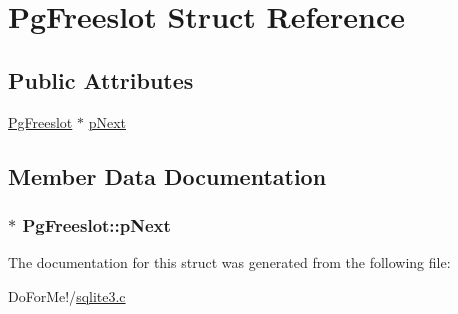 \hypertarget{struct_pg_freeslot}{\section{Pg\-Freeslot Struct Reference}
\label{struct_pg_freeslot}
}
\subsection*{Public Attributes}
\begin{DoxyCompactItemize}
\item 
\hyperlink{struct_pg_freeslot}{Pg\-Freeslot} $\ast$ \hyperlink{struct_pg_freeslot_ac38a6e51f86c650fb943585d7b6c8b70}{p\-Next}
\end{DoxyCompactItemize}


\subsection{Member Data Documentation}
\hypertarget{struct_pg_freeslot_ac38a6e51f86c650fb943585d7b6c8b70}{
\subsubsection[{p\-Next}]{$\ast$ Pg\-Freeslot\-::p\-Next}}\label{struct_pg_freeslot_ac38a6e51f86c650fb943585d7b6c8b70}


The documentation for this struct was generated from the following file\-:\begin{DoxyCompactItemize}
\item 
Do\-For\-Me!/\hyperlink{sqlite3_8c}{sqlite3.\-c}\end{DoxyCompactItemize}
